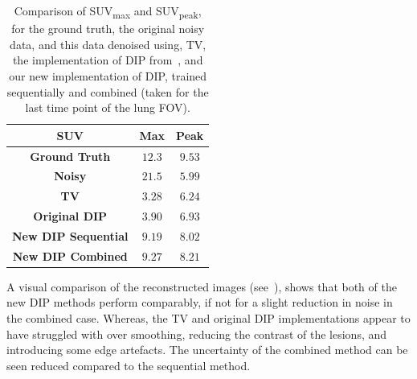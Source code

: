        \begin{table}
            \centering
            
            \captionsetup{singlelinecheck=false, justification=centering}
            \caption{
                Comparison of \gls{SUV}\textsubscript{max} and \gls{SUV}\textsubscript{peak}, for the ground truth, the original noisy data, and this data denoised using, \gls{TV}, the implementation of \gls{DIP} from~\parencite{Gong2019PETPrior}, and our new implementation of \gls{DIP}, trained sequentially and combined (taken for the last time point of the lung \gls{FOV}).
            }
            
            \resizebox*{1.0\linewidth}{!}
            {
                \begin{tabular}{||c|cc||}
                    \hline
                    \textbf{SUV}                & \textbf{Max}  & \textbf{Peak} \\
                    \hline
                    \textbf{Ground Truth}       & $12.3$        & $9.53$ \\
                    \hline
                    \textbf{Noisy}              & $21.5$        & $5.99$ \\
                    \hline
                    \textbf{TV}                 & $3.28$        & $6.24$ \\
                    \textbf{Original DIP}       & $3.90$        & $6.93$ \\
                    \hline
                    \textbf{New DIP Sequential} & $9.19$        & $8.02$ \\
                    \textbf{New DIP Combined}   & $9.27$        & $8.21$ \\
                    \hline
                \end{tabular}
            }
            \label{tab:pseudo_bayesian_dip_denoising_as_a_preprocessing_step_for_kinetic_modelling_in_dynamic_pet_appendix_results_suv}
        \end{table}
        
        A visual comparison of the reconstructed images (see~), shows that both of the new \gls{DIP} methods perform comparably, if not for a slight reduction in noise in the combined case. Whereas, the \gls{TV} and original \gls{DIP} implementations appear to have struggled with over smoothing, reducing the contrast of the lesions, and introducing some edge artefacts. The uncertainty of the combined method can be seen reduced compared to the sequential method.
        
